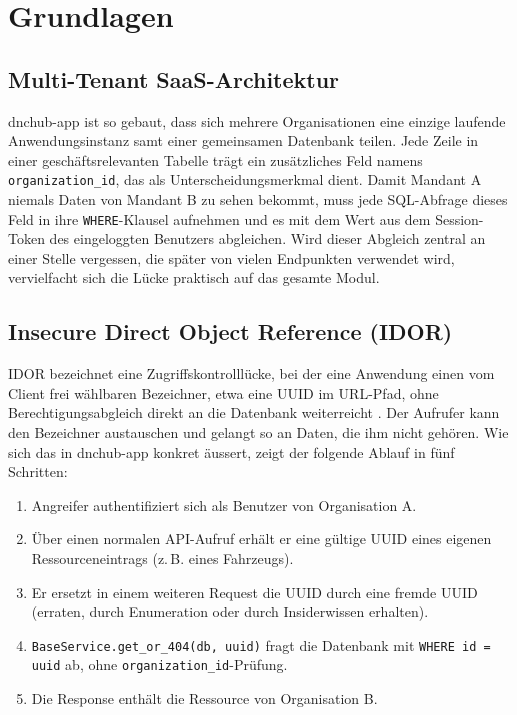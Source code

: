 \section{Grundlagen}
\label{sec:grundlagen}

\subsection{Multi-Tenant SaaS-Architektur}

dnchub-app ist so gebaut, dass sich mehrere Organisationen eine einzige
laufende Anwendungsinstanz samt einer gemeinsamen Datenbank teilen. Jede
Zeile in einer geschäftsrelevanten Tabelle trägt ein zusätzliches Feld
namens \texttt{organization\_id}, das als Unterscheidungsmerkmal dient.
Damit Mandant A niemals Daten von Mandant B zu sehen bekommt, muss jede
SQL-Abfrage dieses Feld in ihre \texttt{WHERE}-Klausel aufnehmen und es
mit dem Wert aus dem Session-Token des eingeloggten Benutzers abgleichen.
Wird dieser Abgleich zentral an einer Stelle vergessen, die später von
vielen Endpunkten verwendet wird, vervielfacht sich die Lücke praktisch
auf das gesamte Modul.

\subsection{Insecure Direct Object Reference (IDOR)}

IDOR bezeichnet eine Zugriffskontrolllücke, bei der eine Anwendung
einen vom Client frei wählbaren Bezeichner, etwa eine UUID im URL-Pfad,
ohne Berechtigungsabgleich direkt an die Datenbank weiterreicht
\parencite{owasp_top10_a01}. Der Aufrufer kann den Bezeichner
austauschen und gelangt so an Daten, die ihm nicht gehören. Wie sich
das in dnchub-app konkret äussert, zeigt der folgende
Ablauf in fünf Schritten:

\begin{enumerate}
      \item Angreifer authentifiziert sich als Benutzer von Organisation A.
      \item Über einen normalen API-Aufruf erhält er eine gültige UUID eines
            eigenen Ressourceneintrags (z.\,B. eines Fahrzeugs).
      \item Er ersetzt in einem weiteren Request die UUID durch eine fremde UUID
            (erraten, durch Enumeration oder durch Insiderwissen erhalten).
      \item \texttt{BaseService.get\_or\_404(db, uuid)} fragt die Datenbank mit
            \texttt{WHERE id = uuid} ab, ohne \texttt{organization\_id}-Prüfung.
      \item Die Response enthält die Ressource von Organisation B.
\end{enumerate}

